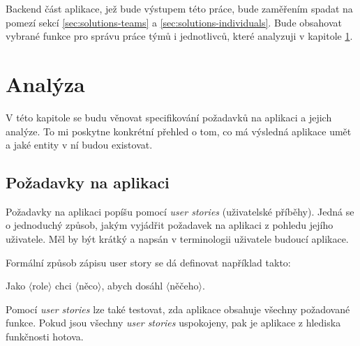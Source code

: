 \documentclass[thesis=B,czech]{FITthesis}[2012/06/26]
\begin{document}
		Backend část aplikace, jež bude výstupem této práce, bude zaměřením spadat na pomezí sekcí \ref{sec:solutions-teams} a \ref{sec:solutions-individuals}. Bude obsahovat vybrané funkce pro správu práce týmů i jednotlivců, které analyzuji v kapitole \ref{chapter:analysis}.

	
\chapter{Analýza}
	\label{chapter:analysis}
	
	V této kapitole se budu věnovat specifikování požadavků na aplikaci a jejich analýze. To mi poskytne konkrétní přehled o tom, co má výsledná aplikace umět a jaké entity v ní budou existovat.
	
	\section{Požadavky na aplikaci}
		Požadavky na aplikaci popíšu pomocí \textit{user stories} (uživatelské příběhy)\cite{user-stories}. Jedná se o jednoduchý způsob, jakým vyjádřit požadavek na aplikaci z pohledu jejího uživatele. Měl by být krátký a napsán v terminologii uživatele budoucí aplikace.
		
		Formální způsob zápisu user story se dá definovat \cite{user-stories-applied-book} například takto:
		\begin{center}
			Jako $\langle$role$\rangle$ chci $\langle$něco$\rangle$, abych dosáhl $\langle$něčeho$\rangle$.
		\end{center}
		Pomocí \textit{user stories} lze také testovat, zda aplikace obsahuje všechny požadované funkce. Pokud jsou všechny \textit{user stories} uspokojeny, pak je aplikace z hlediska funkčnosti hotova.
		
\end{document}
